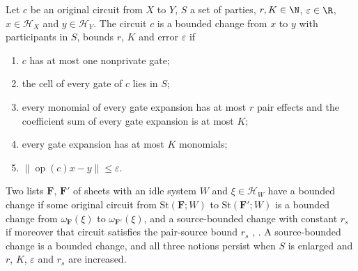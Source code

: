 \begin{definition}
    \label{def:party_bounded_change}
    \leanok
    Let $c$ be an original circuit from $X$ to $Y$, $S$ a set of parties, $r,K\in\N$,
    $\varepsilon\in\R$, $x\in\mathcal H_X$ and $y\in\mathcal H_Y$. The circuit $c$ is a bounded
    change from $x$ to $y$ with participants in $S$, bounds $r$, $K$ and error $\varepsilon$ if
    \begin{enumerate}
        \item $c$ has at most one nonprivate gate;
        \item the cell of every gate of $c$ lies in $S$;
        \item every monomial of every gate expansion has at most $r$ pair effects and the
              coefficient sum of every gate expansion is at most $K$;
        \item every gate expansion has at most $K$ monomials;
        \item $\lVert\operatorname{op}(c)x-y\rVert\leq\varepsilon$.
    \end{enumerate}
    Two lists $\mathbf F$, $\mathbf F'$ of sheets with an idle system $W$ and
    $\xi\in\mathcal H_W$ have a bounded change if some original circuit from
    $\mathrm{St}(\mathbf F;W)$ to $\mathrm{St}(\mathbf F';W)$ is a bounded change from
    $\omega_{\mathbf F}(\xi)$ to $\omega_{\mathbf F'}(\xi)$, and a source-bounded change with
    constant $r_s$ if moreover that circuit satisfies the pair-source bound $r_s$
    \cite[Proposition~7.1]{OpenAI2026PolynomialPEPS}, \cite[Theorem~5.2]{OpenAI2026PolynomialPEPS}.
    A source-bounded change is a bounded change, and all three notions persist when $S$ is
    enlarged and $r$, $K$, $\varepsilon$ and $r_s$ are increased.
\end{definition}

